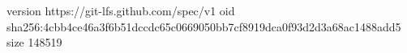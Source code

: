 version https://git-lfs.github.com/spec/v1
oid sha256:4cbb4ce46a3f6b51dccdc65c0669050bb7cf8919dca0f93d2d3a68ac1488add5
size 148519
